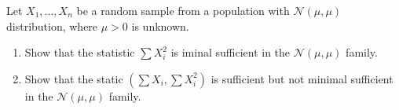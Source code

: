 
\begin{exercise}

Let $X_1, \dots, X_n$ be a random sample from a population with $\mathcal N(\mu, \mu)$ distribution, where $\mu > 0$ is unknown.

\begin{enumerate}[label = (\alph*)]
    \item Show that the statistic $\sum X_i^2$ is iminal sufficient in the $\mathcal N(\mu, \mu)$ family.
    \item Show that the static $(\sum X_i, \sum X_i^2)$ is sufficient but not minimal sufficient in the $\mathcal N(\mu, \mu)$ family.
\end{enumerate}

\end{exercise}


